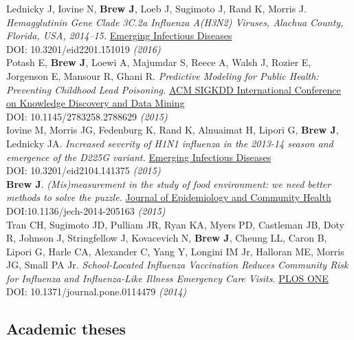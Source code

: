 \documentclass[11pt]{article}
\begin{document}
\noindent Lednicky J, Iovine N, \textbf{Brew J}, Loeb J, Sugimoto J, Rand K, Morris J. \emph{Hemagglutinin Gene Clade 3C.2a Influenza A(H3N2) Viruses, Alachua County, Florida, USA, 2014–15.} \href{http://wwwnc.cdc.gov/eid/article/22/1/15-1019_article}{Emerging Infectious Diseases} \\
DOI: 10.3201/eid2201.151019 \hfill \emph{(2016)} \\

\noindent Potash E, \textbf{Brew J}, Loewi A, Majumdar S, Reece A, Walsh J, Rozier E, Jorgenson E, Mansour R, Ghani R. \emph{Predictive Modeling for Public Health: Preventing Childhood Lead Poisoning.} \href{http://dl.acm.org/citation.cfm?id=2788629&dl=ACM&coll=DL&CFID=747855435&CFTOKEN=56343631}{ACM SIGKDD International Conference on Knowledge Discovery and Data Mining} \\  
DOI: 10.1145/2783258.2788629 \hfill \emph{(2015)}\\

\noindent Iovine M, Morris JG, Fedenburg K, Rand K, Alnuaimat H, Lipori G, \textbf{Brew J}, Lednicky JA. \emph{Increased severity of H1N1 influenza in the 2013-14 season and emergence of the D225G variant.} \href{http://wwwnc.cdc.gov/eid/article/21/4/14-1375_article}{Emerging Infectious Diseases} \\
DOI: 10.3201/eid2104.141375 \hfill \emph{(2015)}\\


\noindent \textbf{Brew J}. \emph{(Mis)measurement in the study of food environment: we need better methods to solve the puzzle.} \href{http://jech.bmj.com/}{Journal of Epidemiology and Community Health} \\
DOI:10.1136/jech-2014-205163 \hfill \emph{(2015)}\\


\noindent Tran CH, Sugimoto JD, Pulliam JR, Ryan KA, Myers PD, Castleman JB, Doty R, Johnson J, Stringfellow J, Kovacevich N, \textbf{Brew J}, Cheung LL, Caron B, Lipori G, Harle CA, Alexander C, Yang Y, Longini IM Jr, Halloran ME, Morris JG, Small PA Jr. \emph{School-Located Influenza Vaccination Reduces Community Risk for Influenza and Influenza-Like Illness Emergency Care Visits.} \href{http://journals.plos.org/plosone/article?id=10.1371/journal.pone.0114479}{PLOS ONE} \\
DOI: 10.1371/journal.pone.0114479 \hfill \emph{(2014)}\\


\subsection*{Academic theses}
\end{document}

